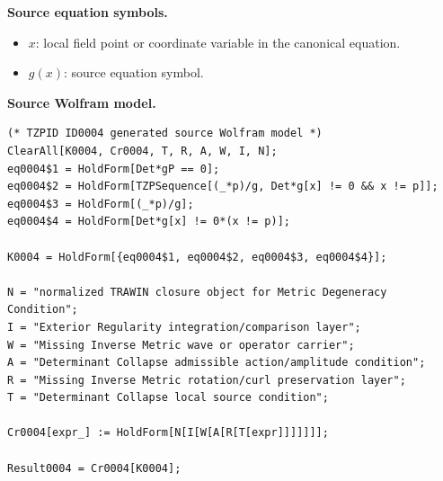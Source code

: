 \begin{minipage}[t]{0.49\linewidth}
\begingroup
\small
\raggedright
\textbf{Source equation symbols.}\par
\begin{itemize}[leftmargin=1.35em,itemsep=1pt,topsep=1pt,parsep=0pt]
    \item $x$: local field point or coordinate variable in the canonical equation.
    \item $g(x)$: source equation symbol.
\end{itemize}
\endgroup
\end{minipage}\hfill
\begin{minipage}[t]{0.47\linewidth}
\begingroup
\scriptsize
\raggedright
\textbf{Source Wolfram model.}\par
\begin{Verbatim}[fontsize=\tiny,breaklines=true,breakanywhere=true]
(* TZPID ID0004 generated source Wolfram model *)
ClearAll[K0004, Cr0004, T, R, A, W, I, N];
eq0004$1 = HoldForm[Det*gP == 0];
eq0004$2 = HoldForm[TZPSequence[(_*p)/g, Det*g[x] != 0 && x != p]];
eq0004$3 = HoldForm[(_*p)/g];
eq0004$4 = HoldForm[Det*g[x] != 0*(x != p)];

K0004 = HoldForm[{eq0004$1, eq0004$2, eq0004$3, eq0004$4}];

N = "normalized TRAWIN closure object for Metric Degeneracy Condition";
I = "Exterior Regularity integration/comparison layer";
W = "Missing Inverse Metric wave or operator carrier";
A = "Determinant Collapse admissible action/amplitude condition";
R = "Missing Inverse Metric rotation/curl preservation layer";
T = "Determinant Collapse local source condition";

Cr0004[expr_] := HoldForm[N[I[W[A[R[T[expr]]]]]]];

Result0004 = Cr0004[K0004];
\end{Verbatim}
\endgroup
\end{minipage}

